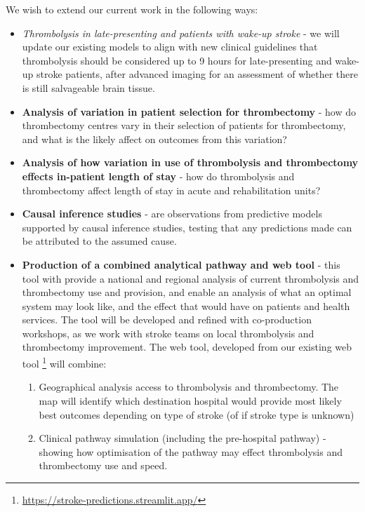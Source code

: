 We wish to extend our current work in the following ways:

\begin{itemize}

    \item \textit{Thrombolysis in late-presenting and patients with wake-up stroke}  - we will update our existing models to align with new clinical guidelines that thrombolysis should be considered up to 9 hours for late-presenting and wake-up stroke patients, after advanced imaging for an assessment of whether there is still salvageable brain tissue.

    \item \textbf{Analysis of variation in patient selection for thrombectomy} - how do thrombectomy centres vary in their selection of patients for thrombectomy, and what is the likely affect on outcomes from this variation?

    \item \textbf{Analysis of how variation in use of thrombolysis and thrombectomy effects in-patient length of stay} - how do thrombolysis and thrombectomy affect length of stay in acute and rehabilitation units?

    \item \textbf{Causal inference studies} - are observations from predictive models supported by causal inference studies, testing that any predictions made can be attributed to the assumed cause.

    \item \textbf{Production of a combined analytical pathway and web tool} - this tool with provide a national and regional analysis of current thrombolysis and thrombectomy use and provision, and enable an analysis of what an optimal system may look like, and the effect that would have on patients and health services. The tool will be developed and refined with co-production workshops, as we work with stroke teams on local thrombolysis and thrombectomy improvement. The web tool, developed from our existing web tool \footnote{\url{https://stroke-predictions.streamlit.app/}} will combine:
    
    \begin{enumerate}
        \item Geographical analysis access to thrombolysis and thrombectomy. The map will identify which destination hospital would provide most likely best outcomes depending on type of stroke (of if stroke type is unknown)

        \item Clinical pathway simulation (including the pre-hospital pathway) - showing how optimisation of the pathway may effect thrombolysis and thrombectomy use and speed.


\end{enumerate}
\end{itemize}
